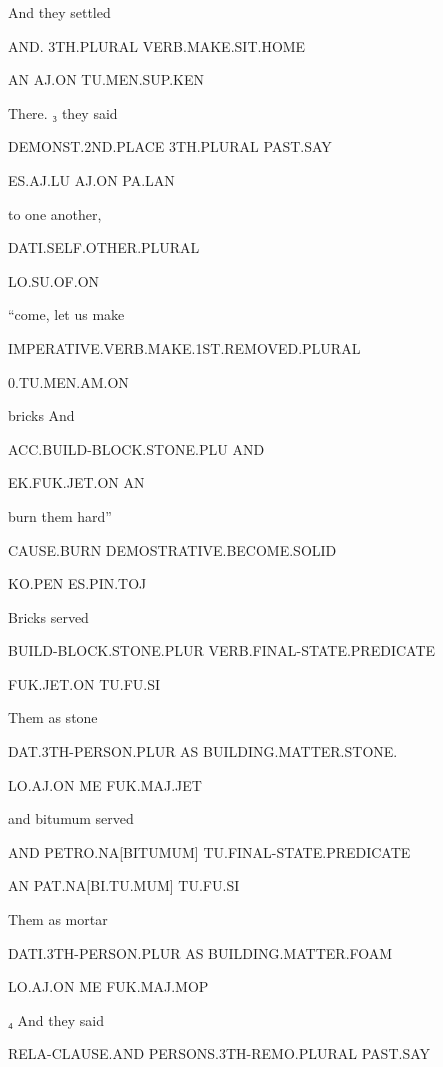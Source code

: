 And 	they 		settled			 

AND.	3TH.PLURAL	VERB.MAKE.SIT.HOME	 

AN	AJ.ON		TU.MEN.SUP.KEN 

  

There.			₃ they		said 	 

DEMONST.2ND.PLACE	3TH.PLURAL	PAST.SAY 

ES.AJ.LU		AJ.ON		PA.LAN	 

  

to one another, 			 

DATI.SELF.OTHER.PLURAL		 

LO.SU.OF.ON 

  

“come, let us make   

IMPERATIVE.VERB.MAKE.1ST.REMOVED.PLURAL 

0.TU.MEN.AM.ON 

 

bricks				And 	 

ACC.BUILD-BLOCK.STONE.PLU 	AND		 

EK.FUK.JET.ON			AN 

  

burn them			hard” 

CAUSE.BURN 			DEMOSTRATIVE.BECOME.SOLID 

KO.PEN				ES.PIN.TOJ				 

Bricks 				served 				 

BUILD-BLOCK.STONE.PLUR          VERB.FINAL-STATE.PREDICATE	 

FUK.JET.ON			TU.FU.SI			 

Them			as 	stone	 

DAT.3TH-PERSON.PLUR AS	BUILDING.MATTER.STONE. 

LO.AJ.ON		ME	FUK.MAJ.JET 

  

and	bitumum 		served  

AND	PETRO.NA[BITUMUM]	TU.FINAL-STATE.PREDICATE 

AN	PAT.NA[BI.TU.MUM]	TU.FU.SI 

  

Them				as 	mortar 

DATI.3TH-PERSON.PLUR               AS	BUILDING.MATTER.FOAM 

LO.AJ.ON			ME	FUK.MAJ.MOP 

  

₄ And 			they 				said  

RELA-CLAUSE.AND          PERSONS.3TH-REMO.PLURAL 	PAST.SAY 

